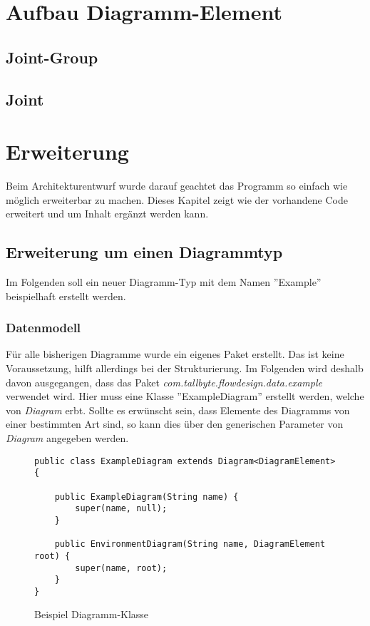 \section{Aufbau Diagramm-Element}
\subsection{Joint-Group}

\subsection{Joint}

\pagebreak
\section{Erweiterung}
Beim Architekturentwurf wurde darauf geachtet das Programm so einfach wie möglich erweiterbar zu machen.
Dieses Kapitel zeigt wie der vorhandene Code erweitert und um Inhalt ergänzt werden kann.

\subsection{Erweiterung um einen Diagrammtyp}
Im Folgenden soll ein neuer Diagramm-Typ mit dem Namen ''Example'' beispielhaft erstellt werden.

\subsubsection{Datenmodell}
Für alle bisherigen Diagramme wurde ein eigenes Paket erstellt. Das ist keine Voraussetzung, hilft allerdings bei der
Strukturierung. Im Folgenden wird deshalb davon ausgegangen, dass das Paket \textit{com.tallbyte.flowdesign.data.example}
verwendet wird.
Hier muss eine Klasse ''ExampleDiagram'' erstellt werden, welche von \textit{Diagram} erbt. Sollte es erwünscht sein,
dass Elemente des Diagramms von einer bestimmten Art sind, so kann dies über den generischen Parameter von 
\textit{Diagram} angegeben werden.

\begin{figure}[h!]
	\centering
	\begin{lstlisting}
public class ExampleDiagram extends Diagram<DiagramElement> {

    public ExampleDiagram(String name) {
        super(name, null);
    }

    public EnvironmentDiagram(String name, DiagramElement root) {
        super(name, root);
    }
}
	\end{lstlisting}
	\caption{Beispiel Diagramm-Klasse}
\end{figure}

